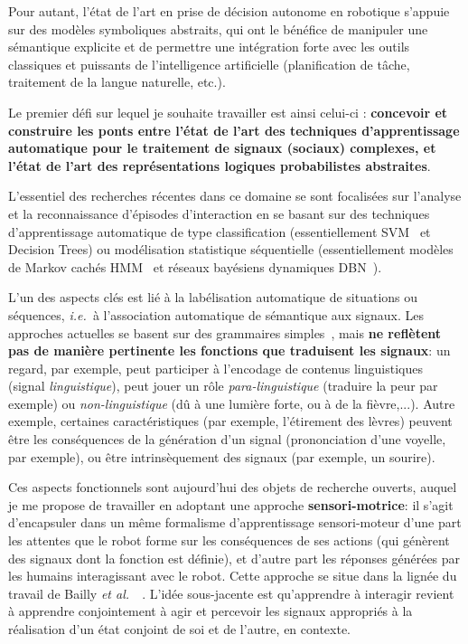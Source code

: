 \documentclass[a4paper]{article}
\newcommand{\etal}{{\textit{et al.~}}}
\newcommand{\ie}{{\textit{i.e.~}}}
\begin{document}
Pour autant, l'état de l'art en prise de décision autonome en robotique s'appuie
sur des modèles symboliques abstraits, qui ont le bénéfice de manipuler une
sémantique explicite et de permettre une intégration forte avec les outils
classiques et puissants de l'intelligence artificielle (planification de tâche,
traitement de la langue naturelle, etc.).

Le premier défi sur lequel je souhaite travailler est ainsi celui-ci :
\textbf{concevoir et construire les ponts entre l'état de l'art des techniques
d'apprentissage automatique pour le traitement de signaux (sociaux)
complexes, et l'état de l'art des représentations logiques probabilistes
abstraites}.

L'essentiel des recherches récentes dans ce domaine se sont focalisées sur
l'analyse et la reconnaissance d'épisodes d'interaction en se basant sur des
techniques d'apprentissage automatique de type classification (essentiellement
SVM~\cite{jayagopi2009modeling} et Decision Trees) ou modélisation statistique
séquentielle (essentiellement modèles de Markov cachés
HMM~\cite{zhang2006modeling,mihoub2014modeling} et réseaux bayésiens dynamiques
DBN~\cite{otsuka2007automatic}).

L'un des aspects clés est lié à la labélisation automatique de situations ou
séquences, \ie à l'association automatique de sémantique aux signaux. Les
approches actuelles se basent sur des grammaires
simples~\cite{mihoub2014modeling}, mais \textbf{ne reflètent pas de manière
pertinente les fonctions que traduisent les signaux}: un regard, par exemple,
peut participer à l'encodage de contenus linguistiques (signal
\emph{linguistique}), peut jouer un rôle \emph{para-linguistique} (traduire la
peur par exemple) ou \emph{non-linguistique} (dû à une lumière forte, ou à de la
fièvre,...). Autre exemple, certaines caractéristiques (par exemple, l'étirement
des lèvres) peuvent être les conséquences de la génération d'un signal
(prononciation d'une voyelle, par exemple), ou être intrinsèquement des signaux
(par exemple, un sourire).

Ces aspects fonctionnels sont aujourd'hui des objets de recherche ouverts,
auquel je me propose de travailler en adoptant une approche
\textbf{sensori-motrice}: il s'agit d'encapsuler dans un même formalisme
d'apprentissage sensori-moteur d'une part les attentes que le robot forme sur
les conséquences de ses actions (qui génèrent des signaux dont la fonction est
définie), et d'autre part les réponses générées par les humains interagissant
avec le robot. Cette approche se situe dans la lignée du travail de Bailly
\etal~\cite{mihoub2014modeling}. L'idée sous-jacente est qu'apprendre à
interagir revient à apprendre conjointement à agir et percevoir les signaux
appropriés à la réalisation d'un état conjoint de soi et de l'autre, en
contexte.
\end{document}
